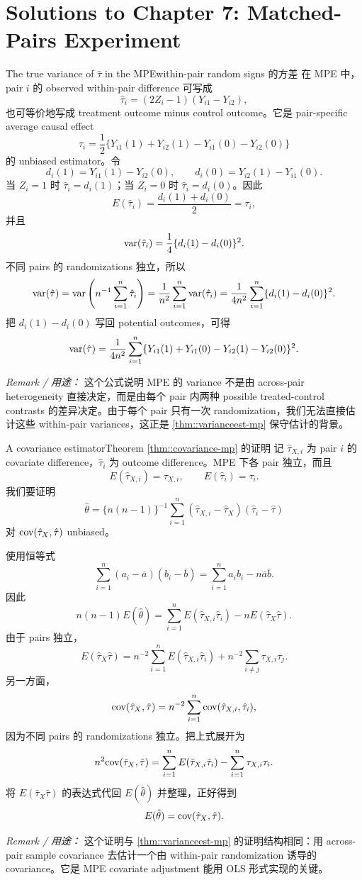 \chapter{Solutions to Chapter 7: Matched-Pairs Experiment}
\label{sol:chapter07}

\begin{exercisesolution}{The true variance of $\hat{\tau}$ in the MPE}{within-pair random signs 的方差}
在 MPE 中，pair $i$ 的 observed within-pair difference 可写成
\[
\hat\tau_i=(2Z_i-1)(Y_{i1}-Y_{i2}),
\]
也可等价地写成 treatment outcome minus control outcome。它是 pair-specific average causal effect
\[
\tau_i=\frac{1}{2}\{Y_{i1}(1)+Y_{i2}(1)-Y_{i1}(0)-Y_{i2}(0)\}
\]
的 unbiased estimator。令
\[
d_i(1)=Y_{i1}(1)-Y_{i2}(0),\qquad
d_i(0)=Y_{i2}(1)-Y_{i1}(0).
\]
当 $Z_i=1$ 时 $\hat\tau_i=d_i(1)$；当 $Z_i=0$ 时 $\hat\tau_i=d_i(0)$。因此
\[
E(\hat\tau_i)=\frac{d_i(1)+d_i(0)}{2}=\tau_i,
\]
并且
\[
\textup{var}(\hat\tau_i)
=\frac{1}{4}\{d_i(1)-d_i(0)\}^2.
\]
不同 pairs 的 randomizations 独立，所以
\[
\textup{var}(\hat\tau)=\textup{var}\left(n^{-1}\sum_{i=1}^n\hat\tau_i\right)
=\frac{1}{n^2}\sum_{i=1}^n\textup{var}(\hat\tau_i)
=\frac{1}{4n^2}\sum_{i=1}^n\{d_i(1)-d_i(0)\}^2.
\]
把 $d_i(1)-d_i(0)$ 写回 potential outcomes，可得
\[
\textup{var}(\hat\tau)
=\frac{1}{4n^2}\sum_{i=1}^n
\{Y_{i1}(1)+Y_{i1}(0)-Y_{i2}(1)-Y_{i2}(0)\}^2.
\]

\emph{Remark / 用途：} 这个公式说明 MPE 的 variance 不是由 across-pair heterogeneity 直接决定，而是由每个 pair 内两种 possible treated-control contrasts 的差异决定。由于每个 pair 只有一次 randomization，我们无法直接估计这些 within-pair variances，这正是 \cref{thm::varianceest-mp} 保守估计的背景。
\end{exercisesolution}

\begin{exercisesolution}{A covariance estimator}{Theorem \ref{thm::covariance-mp} 的证明}
记 $\hat\tau_{X,i}$ 为 pair $i$ 的 covariate difference，$\hat\tau_i$ 为 outcome difference。MPE 下各 pair 独立，而且
\[
E(\hat\tau_{X,i})=\tau_{X,i},\qquad E(\hat\tau_i)=\tau_i.
\]
我们要证明
\[
\hat\theta=\{n(n-1)\}^{-1}\sum_{i=1}^n
(\hat\tau_{X,i}-\hat\tau_X)(\hat\tau_i-\hat\tau)
\]
对 $\textup{cov}(\hat\tau_X,\hat\tau)$ unbiased。

使用恒等式
\[
\sum_{i=1}^n(a_i-\bar a)(b_i-\bar b)
=\sum_{i=1}^n a_i b_i-n\bar a\bar b.
\]
因此
\[
n(n-1)E(\hat\theta)
=\sum_{i=1}^nE(\hat\tau_{X,i}\hat\tau_i)
-nE(\hat\tau_X\hat\tau).
\]
由于 pairs 独立，
\[
E(\hat\tau_X\hat\tau)
=n^{-2}\sum_{i=1}^nE(\hat\tau_{X,i}\hat\tau_i)
+n^{-2}\sum_{i\neq j}\tau_{X,i}\tau_j.
\]
另一方面，
\[
\textup{cov}(\hat\tau_X,\hat\tau)
=n^{-2}\sum_{i=1}^n
\textup{cov}(\hat\tau_{X,i},\hat\tau_i),
\]
因为不同 pairs 的 randomizations 独立。把上式展开为
\[
n^2\textup{cov}(\hat\tau_X,\hat\tau)
=\sum_{i=1}^nE(\hat\tau_{X,i}\hat\tau_i)-\sum_{i=1}^n\tau_{X,i}\tau_i.
\]
将 $E(\hat\tau_X\hat\tau)$ 的表达式代回 $E(\hat\theta)$ 并整理，正好得到
\[
E(\hat\theta)=\textup{cov}(\hat\tau_X,\hat\tau).
\]

\emph{Remark / 用途：} 这个证明与 \cref{thm::varianceest-mp} 的证明结构相同：用 across-pair sample covariance 去估计一个由 within-pair randomization 诱导的 covariance。它是 MPE covariate adjustment 能用 OLS 形式实现的关键。
\end{exercisesolution}

